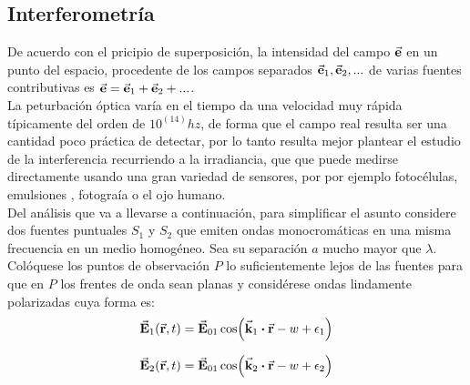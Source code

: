 \documentclass{article}
\begin{document}
  \subsection[Interferometría]{Interferometría}
  \label{sec:interferometria}

  
  De acuerdo con el pricipio de superposición, la
  intensidad del campo $\va{e}$ en un punto del espacio, procedente de
  los campos separados $\va{e}_1, \va{e}_2, ...$ de varias fuentes
  contributivas es $\va{e} = \va{e}_1 + \va{e}_2 + ...$.
  \\
  La peturbación óptica varía en el tiempo da una velocidad muy rápida
  típicamente del orden de $10^{(14)}hz$, de forma que el campo real resulta
  ser una cantidad poco práctica de detectar, por lo tanto resulta mejor
  plantear el estudio de la interferencia recurriendo a la irradiancia, que
  que puede medirse directamente usando una gran variedad de sensores, por
  por ejemplo fotocélulas, emulsiones , fotograía o el ojo humano.
  \\
  Del análisis que va a llevarse a continuación, para simplificar el asunto
  considere dos fuentes puntuales ${S_1}$ y ${S_2}$ que emiten ondas monocromáticas
  en una misma frecuencia en un medio homogéneo. Sea su separación $a$ mucho
  mayor que $\lambda$. Colóquese los puntos de observación $P$ lo suficientemente lejos
  de las fuentes para que en $P$ los frentes de onda sean planas y
  considérese ondas lindamente polarizadas cuya forma es:
  \begin{equation}
    \label{eq:1}
    \va{E}_1(\va{r},t) = \va{E}_{01}\cos(\va{k}_1\dotproduct\va{r} - w + \epsilon_1)
  \end{equation}
  
  \begin{equation}
    \label{eq:2}
    \va{E}_2(\va{r},t) = \va{E}_{01}\cos(\va{k}_2\dotproduct\va{r} - w + \epsilon_2)
  \end{equation}
  
\end{document}
